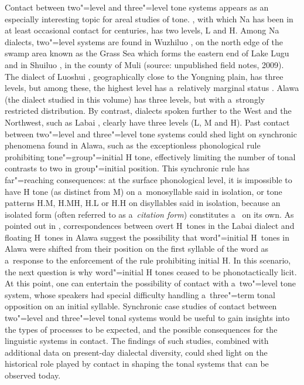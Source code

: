 Contact between two"=level and three"=level tone systems appears as an especially interesting topic for areal studies of tone. , with
which Na has been in at least occasional contact for centuries, has two levels, L and H. Among Na dialects, two"=level systems are found in Wuzhiluo , on the north edge of the swamp area known as the Grass Sea which forms the
eastern end of Lake Lugu \citep{dobbsetal2016} and in Shuiluo , in the county of Muli  (source: unpublished field notes, 2009). The dialect of Luoshui , geographically close to the Yongning plain, has three levels, but among these, the highest level has a~relatively marginal status \citep{lidz2010}. Alawa (the dialect studied in this volume) has three levels, but with a~strongly restricted distribution. By contrast, dialects spoken further to the West and the Northwest, such as Labai , clearly have three levels (L, M and H). Past contact between two"=level and three"=level tone systems could shed light on synchronic phenomena found in Alawa, such as the exceptionless {phonological rule} prohibiting tone"=group"=initial H
tone, effectively limiting the number of tonal contrasts to two in group"=initial position. This synchronic rule has far"=reaching consequences: at the surface phonological level, it is
impossible to have H tone (as distinct from M) on a~monosyllable said in isolation, or tone patterns H.M, H.MH, H.L or
H.H on disyllables said in isolation, because an isolated form (often referred to as a~\textit{citation form}) constitutes a~ on its own. As pointed out in , correspondences between overt H~tones in the Labai dialect and floating H~tones in Alawa suggest the possibility that word"=initial H~tones in Alawa were shifted from their position on the
first syllable of the word as a~response to the enforcement of the rule prohibiting initial H. In this scenario, the next {question} is why word"=initial H tones ceased to be phonotactically licit. At this point, one can entertain the possibility of contact with a~two"=level tone system, whose speakers had special difficulty handling a~three"=term tonal opposition on an initial syllable.  Synchronic case studies of contact between two"=level and three"=level tonal systems would be useful to gain insights into the types of processes to be expected, and the possible consequences for the linguistic systems in contact. The findings of such studies, combined with additional data on present-day dialectal diversity, could shed light on the historical role played by contact in shaping the tonal systems that can be observed today.
